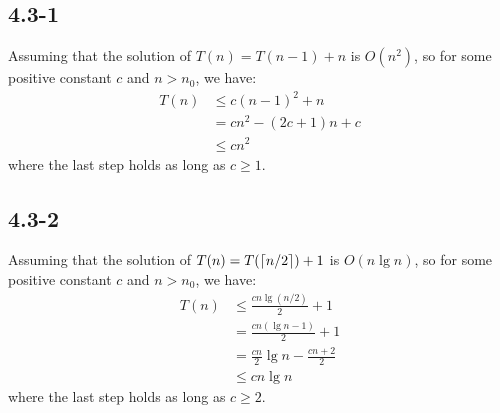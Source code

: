 \subsection{4.3-1}
    Assuming that the solution of $T(n) = T(n-1) + n$ is $O(n^2)$, so for some
    positive constant $c$ and $n > n_0$, we have:
    \begin{align*}
        T(n) & \le c(n - 1)^2 + n \\
             & = cn^2 - (2c + 1 )n + c \\
             & \le cn^2
    \end{align*}
    where the last step holds as long as $c \ge 1$.
\subsection{4.3-2}
    Assuming that the solution of $T(n) = T(\lceil n/2\rceil) + 1$ is $O(n\lg n)$,
    so for some positive constant $c$ and $n > n_0$, we have:
    \begin{align*}
        T(n) & \le \frac{cn\lg(n/2)}{2} + 1 \\
             & = \frac{cn(\lg n - 1)}{2} + 1 \\
             & = \frac{cn}{2}\lg n - \frac{cn+2}{2} \\
             & \le cn\lg n
    \end{align*}
    where the last step holds as long as $c \ge 2$.
